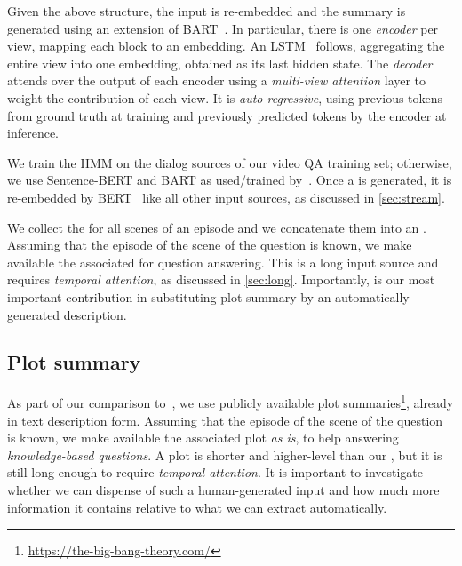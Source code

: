 \documentclass[10pt,twocolumn,letterpaper]{article}
\makeatletter
\renewcommand\paragraph{\@startsection{paragraph}{4}{\z@}{1ex}{-1em}{\normalfont\normalsize\bfseries}}
\makeatother
\begin{document}
Given the above structure, the input is re-embedded and the summary is generated using an extension of BART~\cite{lewis2020bart}. In particular, there is one \emph{encoder} per view, mapping each block to an embedding. An LSTM~\cite{hochreiter1997long} follows, aggregating the entire view into one embedding, obtained as its last hidden state. The \emph{decoder} attends over the output of each encoder using a \emph{multi-view attention} layer to weight the contribution of each view. It is \emph{auto-regressive}, using previous tokens from ground truth at training and previously predicted tokens by the encoder at inference.

We train the HMM on the dialog sources of our video QA training set; otherwise, we use Sentence-BERT and BART as used/trained by~\cite{chen2020multi}. Once a \sceneSum is generated, it is re-embedded by BERT~\cite{devlin-etal-2019-bert} like all other input sources, as discussed in \autoref{sec:stream}.



\paragraph{\up[\episodeSum]}

We collect the \sceneSums for all scenes of an episode and we concatenate them into an \emph{\episodeSum}. Assuming that the episode of the scene of the question is known, we make available the associated \episodeSum for question answering. This is a long input source and requires \emph{temporal attention}, as discussed in \autoref{sec:long}. Importantly, \episodeSum is our most important contribution in substituting plot summary by an automatically generated description.



\subsection{Plot summary}
\label{sec:plot}
As part of our comparison to~\cite{garcia2020knowledge}, we use publicly available plot summaries\footnote{\url{https://the-big-bang-theory.com/}}, already in text description form. Assuming that the episode of the scene of the question is known, we make available the associated plot \emph{as is}, to help answering \emph{knowledge-based questions}. A plot is shorter and higher-level than our \episodeSum, but it is still long enough to require \emph{temporal attention}. It is important to investigate whether we can dispense of such a human-generated input and how much more information it contains relative to what we can extract automatically. 
\end{document}
